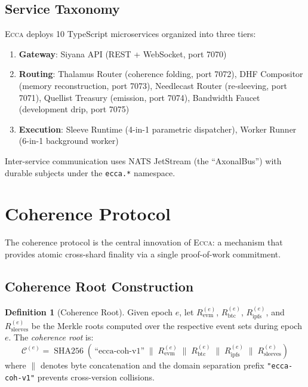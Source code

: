 \documentclass[11pt,twocolumn]{article}
\theoremstyle{definition}
\newtheorem{definition}{Definition}[section]
\theoremstyle{plain}
\theoremstyle{remark}
\newcommand{\ecca}{\textsc{Ecca}}
\DeclareMathOperator{\shatwofiftysix}{SHA256}
\begin{document}
\subsection{Service Taxonomy}

\ecca{} deploys 10 TypeScript microservices organized into three tiers:

\begin{enumerate}[leftmargin=*]
  \item \textbf{Gateway}: Siyana API (REST + WebSocket, port 7070)
  \item \textbf{Routing}: Thalamus Router (coherence folding, port 7072), DHF Compositor (memory reconstruction, port 7073), Needlecast Router (re-sleeving, port 7071), Quellist Treasury (emission, port 7074), Bandwidth Faucet (development drip, port 7075)
  \item \textbf{Execution}: Sleeve Runtime (4-in-1 parametric dispatcher), Worker Runner (6-in-1 background worker)
\end{enumerate}

Inter-service communication uses NATS JetStream (the ``AxonalBus'') with durable subjects under the \texttt{ecca.*} namespace.

\section{Coherence Protocol}\label{sec:coherence}

The coherence protocol is the central innovation of \ecca{}: a mechanism that provides atomic cross-shard finality via a single proof-of-work commitment.

\subsection{Coherence Root Construction}

\begin{definition}[Coherence Root]\label{def:coherence-root}
Given epoch $e$, let $R_{\mathrm{evm}}^{(e)}$, $R_{\mathrm{btc}}^{(e)}$, $R_{\mathrm{ipfs}}^{(e)}$, and $R_{\mathrm{sleeves}}^{(e)}$ be the Merkle roots computed over the respective event sets during epoch $e$. The \emph{coherence root} is:
\begin{equation}\label{eq:coherence-root}
  \mathcal{C}^{(e)} = \shatwofiftysix\!\left(\,\text{``ecca-coh-v1''} \;\|\; R_{\mathrm{evm}}^{(e)} \;\|\; R_{\mathrm{btc}}^{(e)} \;\|\; R_{\mathrm{ipfs}}^{(e)} \;\|\; R_{\mathrm{sleeves}}^{(e)}\right)
\end{equation}
where $\|$ denotes byte concatenation and the domain separation prefix \texttt{"ecca-coh-v1"} prevents cross-version collisions.
\end{definition}
\end{document}
